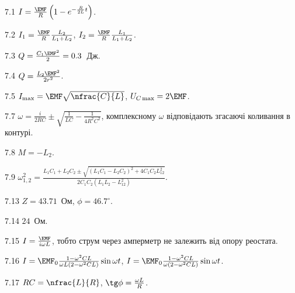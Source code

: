 \protect \section *{}
\begin{Solution}{7.{1}}
	$I = \frac{\EMF}{R}\left( 1-e^{-\frac{R}{2L}t}\right) $.
\end{Solution}
\begin{Solution}{7.{2}}
	$I_1 = \frac{\EMF}{R} \frac{L_2}{L_1 + L_2}$, $I_2 = \frac{\EMF}{R} \frac{L_1}{L_1 + L_2}$.
\end{Solution}
\begin{Solution}{7.{3}}
	$Q = \frac{C_1\EMF^2}{2} = 0.3$~Дж.
\end{Solution}
\begin{Solution}{7.{4}}
	$Q = \frac{L_2\EMF^2}{2r^2}$.
\end{Solution}
\begin{Solution}{7.{5}}
	$I_{\max} = \EMF\sqrt{\nfrac{C}{L}}$, $U_{C\max} =2 \EMF$.
\end{Solution}
\begin{Solution}{7.{7}}
	$\omega = \frac{i}{2RC} \pm \sqrt{\frac{1}{LC} - \frac{1}{4R^2C^2}}$, комплексному $\omega$ відповідають згасаючі коливання в контурі.
\end{Solution}
\begin{Solution}{7.{8}}
	$M = -L_2$.
\end{Solution}
\begin{Solution}{7.{9}}
	$\omega_{1,2}^2 = \frac{L_1C_1 + L_2C_2 \pm \sqrt{(L_1C_1 - L_2C_2)^2 + 4C_1C_2L_{12}^2}}{2C_1C_2(L_1L_2 - L_{12}^2)}$.
\end{Solution}
\begin{Solution}{7.{13}}
    $Z = 43.71$~Ом, $\phi = 46.7^\circ$.
\end{Solution}
\begin{Solution}{7.{14}}
    $24$~Ом.
\end{Solution}
\begin{Solution}{7.{15}}
	$I = \frac{\EMF}{i\omega L}$, тобто струм через амперметр не залежить від опору реостата.
\end{Solution}
\begin{Solution}{7.{16}}
	$I = \EMF_0\frac{1 - \omega^2CL}{\omega L(2 - \omega^2CL)}\sin\omega t$, $I = \EMF_0\frac{1 - \omega^2CL}{\omega(2 - \omega^2CL)}\sin\omega t$.
\end{Solution}
\begin{Solution}{7.{17}}
	$RC = \nfrac{L}{R}$, $\tg\phi = \frac{\omega L}{R}$.
\end{Solution}
